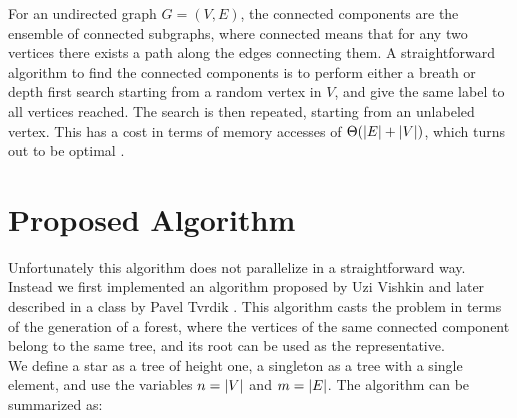 %

For an undirected graph $G=(V,E)$, the connected components are the ensemble
of connected subgraphs, where connected means that for any two vertices there exists a path along
the edges connecting them.
A straightforward algorithm to find the connected components is to perform either
a breath or depth first search starting from a random vertex in $V$,
and give the same label to all vertices reached. The search is then repeated, starting from an
unlabeled vertex.
This has a cost in terms of memory accesses of $\Theta(\left| E \right| + \left| V \right|)$, which turns out
to be optimal \cite{Hopcroft}.

\section{Proposed Algorithm}\label{sec:yourmethod}
%
%


Unfortunately this algorithm does not parallelize in a straightforward
way. Instead we first implemented
an algorithm proposed by Uzi Vishkin \cite{PCompArticle} and later described in a class by Pavel
Tvrdik \cite{PCompClass}. This algorithm casts the problem in terms of the generation of a
forest, where the vertices of the same connected component belong to the same tree, and its root
can be used as the representative.\\
We define a star as a tree of height one, a singleton as a tree with a single element, and
use the variables $n=\left| V \right|$ and $m=\left| E \right|$.
The algorithm can be summarized as:

